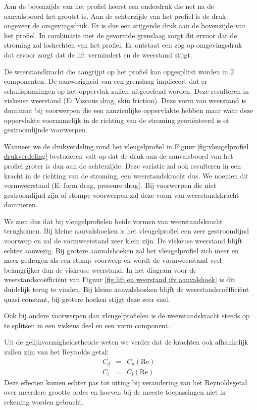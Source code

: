 Aan de bovenzijde van het profiel heerst een onderdruk die net na de aanvalsboord het grootst is. Aan de achterzijde van het profiel is de druk ongeveer de omgevingsdruk. Er is dus een stijgende druk aan de bovenzijde van het profiel. In combinatie met de gevormde grenslaag zorgt dit ervoor dat de stroming zal loshechten van het profiel. Er ontstaat een zog op omgevingsdruk dat ervoor zorgt dat de lift vermindert en de weerstand stijgt.

De weerstandkracht die aangrijpt op het profiel kan opgesplitst worden in 2 componenten. De aanwezigheid van een grenslaag impliceert dat er schuifspanningen op het oppervlak zullen uitgeoefend worden. Deze resulteren in viskeuse weerstand (E: Viscous drag, skin friction). Deze vorm van weerstand is dominant bij voorwerpen die een aanzienlijke oppervlakte hebben maar waar deze oppervlakte voornamelijk in de richting van de stroming georiënteerd is of gestroomlijnde voorwerpen.

Wanneer we de drukverdeling rond het vleugelprofiel in Figuur \ref{fig:vleugelprofiel drukverdeling} bestuderen valt op dat de druk aan de aanvalsboord van het profiel groter is dan aan de achterzijde. Deze variatie zal ook resulteren in een kracht in de richting van de stroming, een weerstandskracht dus. We noemen dit vormweerstand (E: form drag, pressure drag). Bij voorwerpen die niet gestroomlijnd zijn of stompe voorwerpen zal deze vorm van weerstandskracht domineren.

We zien dus dat bij vleugelprofielen beide vormen van weerstandskracht terugkomen. Bij kleine aanvalshoeken is het vleugelprofiel een zeer gestroomlijnd voorwerp en zal de vormweerstand zeer klein zijn. De viskeuse weerstand blijft echter aanwezig. Bij grotere aanvalshoeken zal het vleugelprofiel zich meer en meer gedragen als een stomp voorwerp en wordt de vormweerstand veel belangrijker dan de viskeuse weerstand. In het diagram voor de weerstandscoëfficiënt van Figuur \ref{fig:lift en weerstand ifv aanvalshoek} is dit duidelijk terug te vinden. Bij kleine aanvalshoeken blijft de weerstandscoëfficiënt quasi constant, bij grotere hoeken stijgt deze zeer snel.

Ook bij andere voorwerpen dan vleugelprofielen is de weerstandskracht steeds op te splitsen in een viskeus deel en een vorm component.

Uit de gelijkvormigheidstheorie weten we verder dat de krachten ook afhankelijk zullen zijn van het Reynolds getal: 
\begin{eqnarray}
	C_d &=& C_d(\text{Re}) \\
	C_l &=& C_l(\text{Re})
\end{eqnarray}
Deze effecten komen echter pas tot uiting bij verandering van het Reynoldsgetal over meerdere grootte ordes en hoeven bij de meeste toepassingen niet in rekening worden gebracht.

